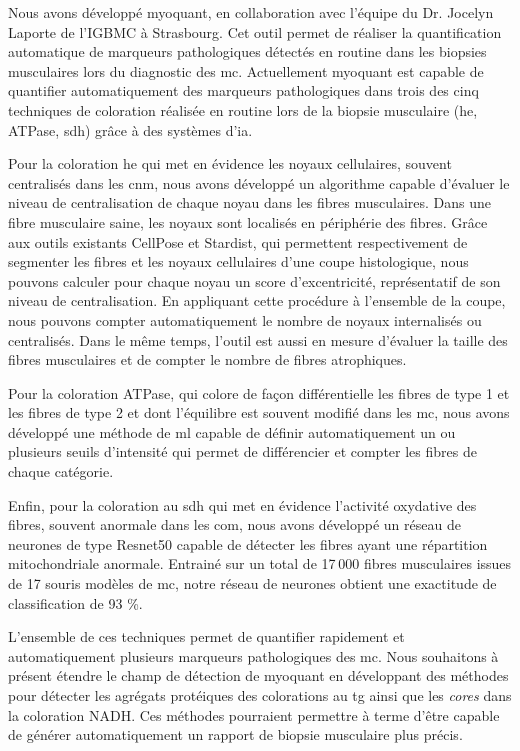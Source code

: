 Nous avons développé \gls{myoquant}, en collaboration avec l’équipe du Dr. Jocelyn Laporte de l’IGBMC à Strasbourg. Cet outil permet de réaliser la quantification automatique de marqueurs pathologiques détectés en routine dans les biopsies musculaires lors du diagnostic des \gls{mc}. Actuellement \gls{myoquant} est capable de quantifier automatiquement des marqueurs pathologiques dans trois des cinq techniques de coloration réalisée en routine lors de la biopsie musculaire (\gls{he}, ATPase, \gls{sdh}) grâce à des systèmes d’\gls{ia}.

Pour la coloration \gls{he} qui met en évidence les noyaux cellulaires, souvent centralisés dans les \gls{cnm}, nous avons développé un algorithme capable d’évaluer le niveau de centralisation de chaque noyau dans les fibres musculaires. Dans une fibre musculaire saine, les noyaux sont localisés en périphérie des fibres. Grâce aux outils existants CellPose et Stardist, qui permettent respectivement de segmenter les fibres et les noyaux cellulaires d’une coupe histologique, nous pouvons calculer pour chaque noyau un score d’excentricité, représentatif de son niveau de centralisation. En appliquant cette procédure à l’ensemble de la coupe, nous pouvons compter automatiquement le nombre de noyaux internalisés ou centralisés. Dans le même temps, l’outil est aussi en mesure d’évaluer la taille des fibres musculaires et de compter le nombre de fibres atrophiques.

Pour la coloration ATPase, qui colore de façon différentielle les fibres de type 1 et les fibres de type 2 et dont l'équilibre est souvent modifié dans les \gls{mc}, nous avons développé une méthode de \gls{ml} capable de définir automatiquement un ou plusieurs seuils d’intensité qui permet de différencier et compter les fibres de chaque catégorie.

Enfin, pour la coloration au \gls{sdh} qui met en évidence l’activité oxydative des fibres, souvent anormale dans les \gls{com}, nous avons développé un réseau de neurones de type Resnet50 capable de détecter les fibres ayant une répartition mitochondriale anormale. Entrainé sur un total de 17 000 fibres musculaires issues de 17 souris modèles de \gls{mc}, notre réseau de neurones obtient une exactitude de classification de 93 \%.

L’ensemble de ces techniques permet de quantifier rapidement et automatiquement plusieurs marqueurs pathologiques des \gls{mc}. Nous souhaitons à présent étendre le champ de détection de \gls{myoquant} en développant des méthodes pour détecter les agrégats protéiques des colorations au \gls{tg} ainsi que les \textit{cores} dans la coloration NADH. Ces méthodes pourraient permettre à terme d’être capable de générer automatiquement un rapport de biopsie musculaire plus précis. 


